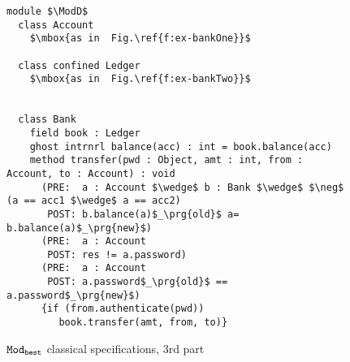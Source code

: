 \begin{figure}[ht]
\begin{lstlisting}[mathescape=true, frame=lines]
module $\ModD$
  class Account
    $\mbox{as in  Fig.\ref{f:ex-bankOne}}$

  class confined Ledger
    $\mbox{as in  Fig.\ref{f:ex-bankTwo}}$
      

  class Bank
    field book : Ledger
    ghost intrnrl balance(acc) : int = book.balance(acc)
    method transfer(pwd : Object, amt : int, from : Account, to : Account) : void
      (PRE:  a : Account $\wedge$ b : Bank $\wedge$ $\neg$ (a == acc1 $\wedge$ a == acc2)
       POST: b.balance(a)$_\prg{old}$ a= b.balance(a)$_\prg{new}$)
      (PRE:  a : Account
       POST: res != a.password)
      (PRE:  a : Account
       POST: a.password$_\prg{old}$ == a.password$_\prg{new}$)
      {if (from.authenticate(pwd))
         book.transfer(amt, from, to)}
\end{lstlisting}
\caption{${\texttt{Mod}}_{{\texttt{best}}}$ classical specifications,  3rd part}
\label{f:ex-bankThree}
\end{figure}



